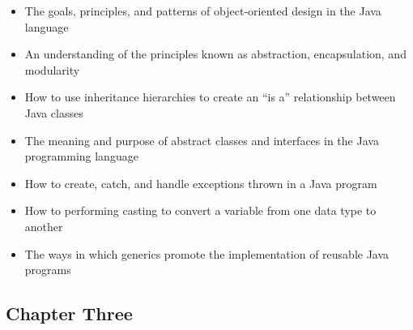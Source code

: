 \documentclass[11pt]{article}
\begin{document}
\begin{itemize}

  \setlength{\itemsep}{0.05in}

  \item The goals, principles, and patterns of object-oriented design in the
    Java language
  \item An understanding of the principles known as abstraction, encapsulation, and modularity
  \item How to use inheritance hierarchies to create an ``is a'' relationship
    between Java classes
  \item The meaning and purpose of abstract classes and interfaces in the Java
    programming language
  \item How to create, catch, and handle exceptions thrown in a Java program
  \item How to performing casting to convert a variable from one data type to another
  \item The ways in which generics promote the implementation of reusable Java
    programs

\end{itemize}

\vspace*{-.2in}
\subsection*{Chapter Three}
\end{document}
